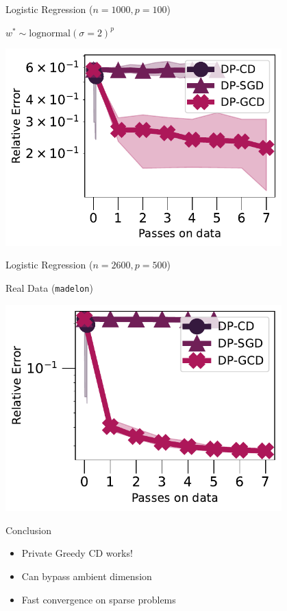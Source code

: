 \documentclass{beamer}
\begin{document}
\begin{frame}
  \begin{center}
    Logistic Regression ($n=1000,p=100$)

    $w^* \sim \text{lognormal}(\sigma=2)^p$

    \includegraphics[width=0.8\textwidth]{plots_final/lognormal_opt_2_norm.pdf}
  \end{center}
\end{frame}

\begin{frame}
  \begin{center}
    Logistic Regression ($n=2600, p=500$)

    Real Data (\texttt{madelon})

    \includegraphics[width=0.8\textwidth]{plots_final/madelon_l2_norm.pdf}
  \end{center}
\end{frame}

\begin{frame}
  {
    \begin{center}
      \Huge Conclusion
    \end{center}
  }

  \begin{itemize}
  \item Private Greedy CD works!
  \item Can bypass ambient dimension
  \item Fast convergence on sparse problems
  \end{itemize}

\end{frame}
\end{document}
